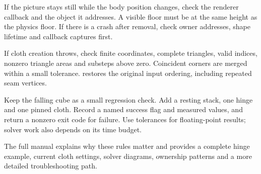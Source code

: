 \documentclass[11pt,a4paper]{article}
\begin{document}
If the picture stays still while the body position changes, check the renderer callback and the object it addresses. A visible floor must be at the same height as the physics floor. If there is a crash after removal, check owner addresses, shape lifetime and callback captures first.

If cloth creation throws, check finite coordinates, complete triangles, valid indices, nonzero triangle areas and substeps above zero. Coincident corners are merged within a small tolerance.  restores the original input ordering, including repeated seam vertices.

Keep the falling cube as a small regression check. Add a resting stack, one hinge and one pinned cloth. Record a named success flag and measured values, and return a nonzero exit code for failure. Use tolerances for floating-point results; solver work also depends on its time budget.

The full manual explains why these rules matter and provides a complete hinge example, current cloth settings, solver diagrams, ownership patterns and a more detailed troubleshooting path.
\end{document}
